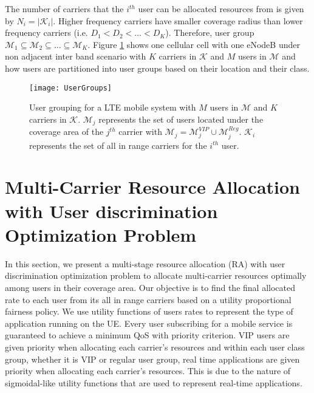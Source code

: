 \documentclass[journal]{IEEEtran} 				\IEEEoverridecommandlockouts 						\usepackage{amsmath,amssymb}
\begin{document}
The number of carriers that the $i^{th}$ user can be allocated resources from is given by $N_i=|\mathcal{K}_i|$. Higher frequency carriers have smaller coverage radius than lower frequency carriers (i.e. $D_1<D_2<...<D_K$). Therefore, user group $\mathcal{M}_1 \subseteq \mathcal{M}_2 \subseteq ...\subseteq \mathcal{M}_K$. Figure \ref{fig:UserGroups} shows one cellular cell with one eNodeB under non adjacent inter band scenario with $K$ carriers in $\mathcal{K}$ and $M$ users in $\mathcal{M}$ and how users are partitioned into user groups based on their location and their class.
\begin{figure}[tb]
\centering
\texttt{[image: UserGroups]}
\caption{User grouping for a LTE mobile system with $M$ users in $\mathcal{M}$ and $K$ carriers in $\mathcal{K}$. $\mathcal{M}_j$ represents the set of users located under the coverage area of the $j^{th}$ carrier with $\mathcal{M}_j=\mathcal{M}_j^{VIP}\cup \mathcal{M}_j^{Reg}$. $\mathcal{K}_i$ represents the set of all in range carriers for the $i^{th}$ user.}
\label{fig:UserGroups}
\end{figure}
\section{Multi-Carrier Resource Allocation with User discrimination Optimization Problem}\label{sec:ResourceAllocation}
In this section, we present a multi-stage resource allocation (RA) with user discrimination optimization problem to allocate multi-carrier resources optimally among users in their coverage area. Our objective is to find the final allocated rate to each user from its all in range carriers based on a utility proportional fairness policy. We use utility functions of users rates to represent the type of application running on the UE. Every user subscribing for a mobile service is guaranteed to achieve a minimum QoS with priority criterion. VIP users are given priority when allocating each carrier's resources and within each user class group, whether it is VIP or regular user group, real time applications are given priority when allocating each carrier's resources. This is due to the nature of sigmoidal-like utility functions that are used to represent real-time applications.
\end{document}
